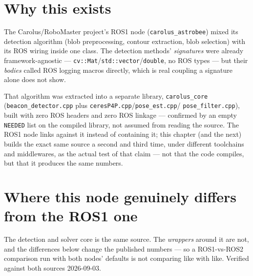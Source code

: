 \documentclass[11pt]{report}
\begin{document}
\section{Why this exists}

The Carolus/RoboMaster project's ROS1 node (\texttt{carolus\_astrobee}) mixed
its detection algorithm (blob preprocessing, contour extraction, blob
selection) with its ROS wiring inside one class. The detection methods'
\emph{signatures} were already framework-agnostic ---
\texttt{cv::Mat}/\texttt{std::vector}/\texttt{double}, no ROS types --- but
their \emph{bodies} called ROS logging macros directly, which is real
coupling a signature alone does not show.

That algorithm was extracted into a separate library, \texttt{carolus\_core}
(\texttt{beacon\_detector.cpp} plus \texttt{ceresP4P.cpp}/\texttt{pose\_est.cpp}/%
\texttt{pose\_filter.cpp}), built with zero ROS headers and zero ROS linkage
--- confirmed by an empty \texttt{NEEDED} list on the compiled library, not
assumed from reading the source. The ROS1 node links against it instead of
containing it; this chapter (and the next) builds the exact same source a
second and third time, under different toolchains and middlewares, as the
actual test of that claim --- not that the code compiles, but that it
produces the same numbers.

\section{Where this node genuinely differs from the ROS1 one}
\label{sec:ros2-vs-ros1}

The detection and solver core is the same source. The \emph{wrappers} around
it are not, and the differences below change the published numbers --- so a
ROS1-vs-ROS2 comparison run with both nodes' defaults is not comparing like
with like. Verified against both sources 2026-09-03.
\end{document}
